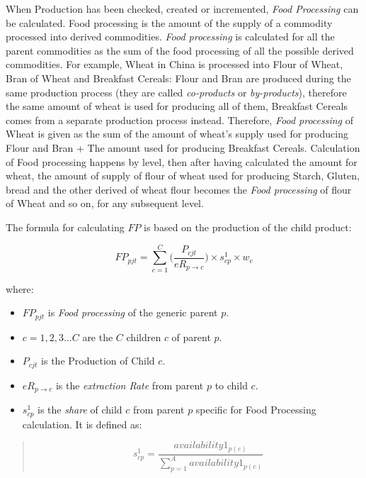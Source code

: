 \documentclass[]{article}
\providecommand{\tightlist}{%
  \setlength{\itemsep}{0pt}\setlength{\parskip}{0pt}}
\begin{document}
When Production has been checked, created or incremented, \emph{Food
Processing} can be calculated. Food processing is the amount of the
supply of a commodity processed into derived commodities. \emph{Food
processing} is calculated for all the parent commodities as the sum of
the food processing of all the possible derived commodities. For
example, Wheat in China is processed into Flour of Wheat, Bran of Wheat
and Breakfast Cereals: Flour and Bran are produced during the same
production process (they are called \emph{co-products} or
\emph{by-products}), therefore the same amount of wheat is used for
producing all of them, Breakfast Cereals comes from a separate
production process instead. Therefore, \emph{Food processing} of Wheat
is given as the sum of the amount of wheat's supply used for producing
Flour and Bran + The amount used for producing Breakfast Cereals.
Calculation of Food processing happens by level, then after having
calculated the amount for wheat, the amount of supply of flour of wheat
used for producing Starch, Gluten, bread and the other derived of wheat
flour becomes the \emph{Food processing} of flour of Wheat and so on,
for any subsequent level.

The formula for calculating \(FP\) is based on the production of the
child product:

\begin{equation}
\label{eq:Food Processing}
FP_{pjt} = \sum \limits_{c=1}^C\biggl(\frac{P_{cjt}}{eR_{p\to c}}\biggr)\times s^{1}_{cp}\times w_{c}
\end{equation}

where:

\begin{itemize}
\tightlist
\item
  \(FP_{pjt}\) is \emph{Food processing} of the generic parent \(p\).
\item
  \(c = 1,2,3...C\) are the \(C\) children \(c\) of parent \(p\).
\item
  \(P_{cjt}\) is the Production of Child \(c\).
\item
  \(eR_{p\to c}\) is the \emph{extraction Rate} from parent \(p\) to
  child \(c\).
\item
  \(s^{1}_{cp}\) is the \emph{share} of child \(c\) from parent \(p\)
  specific for Food Processing calculation. It is defined as:
\end{itemize}

\begin{quote}
\begin{equation}
\label{eq:shares}
s^{1}_{cp} = \frac{availability1_{p(c)}}{\sum \limits_{p=1}^A{availability1_{p(c)}}}
\end{equation}
\end{quote}
\end{document}

